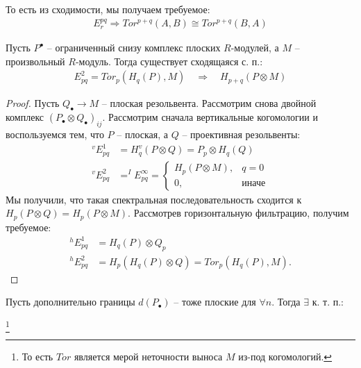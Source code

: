 \documentclass[../main.tex]{subfiles}
\begin{document}
То есть из сходимости, мы получаем требуемое:
\begin{align*}
E_r^{pq} \Rightarrow Tor^{p+q}(A, B) \cong Tor^{p+q}(B, A)
\end{align*}
\begin{to_suj}
Пусть $P^{\bullet}$ -- ограниченный снизу комплекс плоских $R$-модулей, а $M$ -- произвольный $R$-модуль. Тогда существует сходящаяся с. п.:
\begin{align*}
    E_{pq}^2 = Tor_p(H_q(P),M)\quad \Rightarrow \quad H_{p+q}(P \otimes M)
\end{align*}
\end{to_suj}
\begin{proof}
Пусть $Q_\bullet \to M$ -- плоская резольвента. Рассмотрим снова двойной комплекс $(P_\bullet\otimes Q_\bullet)_{ij}$. Рассмотрим сначала вертикальные когомологии и воспользуемся тем, что $P$ -- плоская, а $Q$ -- проективная резольвенты:
\begin{align*}
^{v}E_{pq}^1&=H_q^{v}(P\otimes Q) = P_p\otimes H_q(Q)\\
^{v}E_{pq}^2&=^{I}E_{pq}^{\infty} =\begin{cases} H_p(P\otimes M), & q = 0\\ 0, & \text{иначе}\end{cases}
\end{align*}
Мы получили, что такая спектральная последовательность сходится к $H_p(P\otimes Q) = H_p( P\otimes M)$. Рассмотрев горизонтальную фильтрацию, получим требуемое:
\begin{align*}
^{h}E_{pq}^1&= H_q(P)\otimes Q_p\\
^{h}E_{pq}^2&= H_p(H_q(P)\otimes Q) =Tor_p(H_q (P), M).
\end{align*}
\end{proof}
\begin{to_suj}
Пусть дополнительно границы $d(P_\bullet)$ -- тоже плоские для $\forall n$. 
Тогда $\exists$ к. т. п.:
\bee
{}
\eee\footnote{То есть $Tor$ является мерой неточности выноса $M$ из-под когомологий.}
\end{to_suj}
\end{document}
